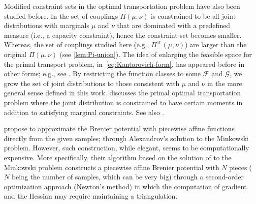 \documentclass[10pt]{article}
\newcommand{\calF}{\mathcal{F}}
\newcommand{\calG}{\mathcal{G}}
\newcommand{\calK}{\mathcal{K}}
\numberwithin{equation}{section}
\begin{document}
Modified constraint sets in the optimal transportation problem have also been studied before. %
%
In \citet{korman2015optimal} the set of couplings $\Pi(\mu,\nu)$ is constrained to be all joint distributions with marginals $\mu$ and $\nu$ that are dominated with a predefined measure (i.e., a capacity constraint), hence the constraint set becomes smaller. Whereas, the set of couplings studied here (e.g., $\Pi^\calK_\equiv(\mu,\nu)$) are larger than the original $\Pi(\mu,\nu)$ (see \autoref{lem:Pi-union}). The idea of enlarging the feasible space for the primal transport problem, in~\eqref{eq:Kantorovich-form}, has appeared before in other forms; e.g., see \cite{beiglbock2009general}. By restricting the function classes to some $\calF$ and $\calG$, we grow the set of joint distributions to those consistent with $\mu$ and $\nu$ in the more general sense defined in this work. \cite[Section 4.6]{rachev1998mass} discusses the primal optimal transportation problem where the joint distribution is constrained to have certain moments in addition to satisfying marginal constraints. See also \citet{zaev2015monge}. 


\citet{guo2019mode} propose to approximate the Brenier potential with piecewise affine functions directly from the given samples; through Alexandrov’s solution to the Minkowski problem. However, such construction, while elegant, seems to be computationally expensive. More specifically, their algorithm based on the solution of \citet{gu2016variational} to the Minkowski problem constructs a piecewise affine Brenier potential with $N$ pieces ($N$ being the number of samples, which can be very big) through a second-order optimization approach (Newton’s method) in which the computation of gradient and the Hessian may require maintaining a triangulation.
\end{document}
